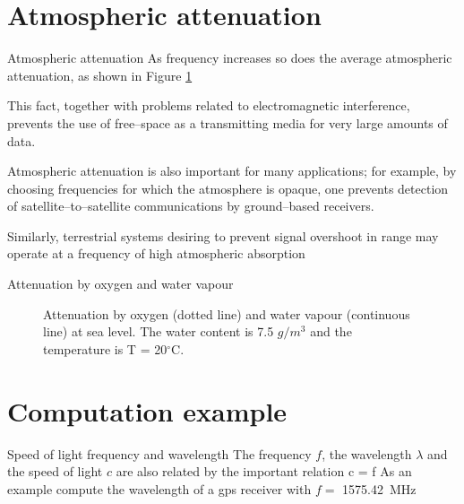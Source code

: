 \documentclass[10pt]{beamer}
\begin{document}
\section{Atmospheric attenuation}
\begin{frame}[fragile]{Atmospheric attenuation}
%
\alert{As frequency increases so
does the average atmospheric attenuation},  as
shown in Figure \ref{EMattenuation} 
 
This fact,  together  with   problems
related   to   electromagnetic  interference,
 \alert{prevents   the use of 
free--space   as   a transmitting  media for very large  amounts 
of data}.   

\alert{Atmospheric   attenuation   is   also
important for many applications}; for example,
by   choosing  frequencies  for   which   the
atmosphere is opaque, one prevents  detection
of  satellite--to--satellite communications  by
ground--based      receivers.       

Similarly,
terrestrial  systems  desiring   to   prevent
signal  overshoot in range may operate  at  a
frequency   of  high  atmospheric  absorption

\end{frame}
\begin{frame}[fragile]{Attenuation by oxygen  and water vapour}
%
\begin{figure}[tb]
\atmatt
\caption{Attenuation by oxygen (dotted line) and water vapour
         (continuous line) at sea
         level. The water content is 7.5 $g/m^{3}$ and the
         temperature is T = 20$^{\circ}$C.}
\label{EMattenuation} 
\end{figure}
\end{frame}

\section{Computation example}
\begin{frame}[fragile]{Speed of light frequency and wavelength}
The frequency $f$, the wavelength $\lambda$ and the speed of light $c$ are also related by the \alert{important relation
\be
c = f \lambda
\ee
}
As an example compute the wavelength of a gps receiver with $f=$ \SI{ 1575.42} {\mega \hertz} 

\end{frame}
\end{document}
